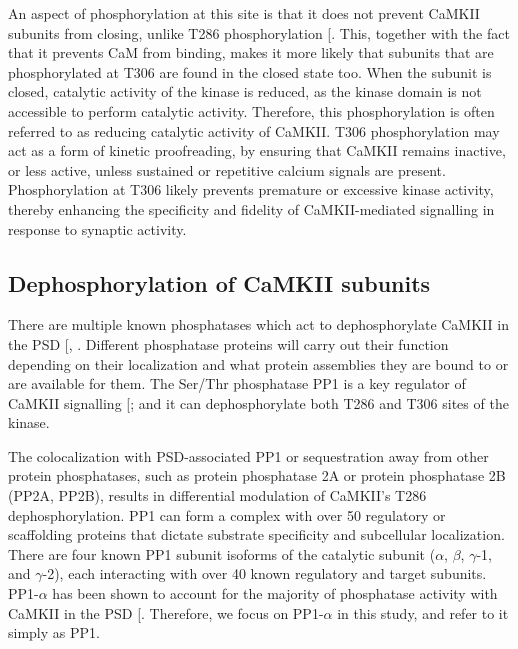 \documentclass[
  11pt,
  letterpaper,
]{scrreprt}
\begin{document}
An aspect of phosphorylation at this site is that it does not prevent
CaMKII subunits from closing, unlike T286 phosphorylation
{[}\citeproc{ref-cook2021CaMKIIb}{198}{]}. This, together with the fact
that it prevents CaM from binding, makes it more likely that subunits
that are phosphorylated at T306 are found in the closed state too. When
the subunit is closed, catalytic activity of the kinase is reduced, as
the kinase domain is not accessible to perform catalytic activity.
Therefore, this phosphorylation is often referred to as reducing
catalytic activity of CaMKII. T306 phosphorylation may act as a form of
kinetic proofreading, by ensuring that CaMKII remains inactive, or less
active, unless sustained or repetitive calcium signals are present.
Phosphorylation at T306 likely prevents premature or excessive kinase
activity, thereby enhancing the specificity and fidelity of
CaMKII-mediated signalling in response to synaptic activity.

\subsection{Dephosphorylation of CaMKII
subunits}\label{dephosphorylation-of-camkii-subunits}

There are multiple known phosphatases which act to dephosphorylate
CaMKII in the PSD {[},
\citeproc{ref-cohen1997Novel}{470}{]}. Different phosphatase proteins
will carry out their function depending on their localization and what
protein assemblies they are bound to or are available for them. The
Ser/Thr phosphatase PP1 is a key regulator of CaMKII signalling
{[}\citeproc{ref-shioda2017Physiological}{471}{]}; and it can
dephosphorylate both T286 and T306 sites of the kinase.

The colocalization with PSD-associated PP1 or sequestration away from
other protein phosphatases, such as protein phosphatase 2A or protein
phosphatase 2B (PP2A, PP2B), results in differential modulation of
CaMKII's T286 dephosphorylation. PP1 can form a complex with over 50
regulatory or scaffolding proteins that dictate substrate specificity
and subcellular localization. There are four known PP1 subunit isoforms
of the catalytic subunit (\(\alpha\), \(\beta\), \(\gamma\)-1, and
\(\gamma\)-2), each interacting with over 40 known regulatory and target
subunits. PP1-\(\alpha\) has been shown to account for the majority of
phosphatase activity with CaMKII in the PSD
{[}\citeproc{ref-colbran2004Protein}{147}{]}. Therefore, we focus on
PP1-\(\alpha\) in this study, and refer to it simply as PP1.
\end{document}
